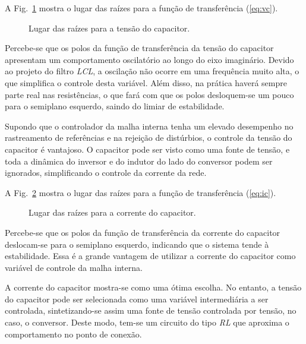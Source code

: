     A Fig.~\ref{fig:rlocus_vc} mostra o lugar das raízes para a função de
    transferência (\ref{eq:vc}).

    \begin{figure}[htb]
        \centering{
           }
        \renewcommand\figurename{Fig.}
        \caption{Lugar das raízes para a tensão do capacitor.}
        \label{fig:rlocus_vc}
    \end{figure}

    Percebe-se que os polos da função de transferência da tensão do capacitor
    apresentam um comportamento oscilatório ao longo do eixo imaginário. Devido
    ao projeto do filtro \emph{LCL}, a oscilação não ocorre em uma frequência
    muito alta, o que simplifica o controle desta variável. Além disso, na prática
    haverá sempre parte real nas resistências, o que fará com que os polos desloquem-se
    um pouco para o semiplano esquerdo, saindo do limiar de estabilidade.

    Supondo que o controlador da malha interna tenha um elevado desempenho
    no rastreamento de referências e na rejeição de distúrbios,
    o controle da tensão do capacitor é vantajoso. O capacitor
    pode ser visto como uma fonte de tensão, e toda a dinâmica
    do inversor e do indutor do lado do conversor podem ser ignorados,
    simplificando o controle da corrente da rede.

    A Fig.~\ref{fig:rlocus_ic} mostra o lugar das raízes para a função de
    transferência (\ref{eq:ic}).

    \begin{figure}[htb]
        \centering{
            }
        \renewcommand\figurename{Fig.}
        \caption{Lugar das raízes para a corrente do capacitor.}
        \label{fig:rlocus_ic}
    \end{figure}

    Percebe-se que os polos da função de transferência da corrente do capacitor
    deslocam-se para o semiplano esquerdo, indicando que o sistema tende à
    estabilidade. Essa é a grande vantagem de utilizar a corrente do capacitor
    como variável de controle da malha interna.

    A corrente do capacitor mostra-se como uma ótima escolha. No entanto, a tensão
    do capacitor pode ser selecionada como uma variável intermediária a ser controlada,
    sintetizando-se assim uma fonte de tensão controlada por tensão, no caso, o
    conversor. Deste modo, tem-se um circuito do tipo \emph{RL} que aproxima o
    comportamento no ponto de conexão.

